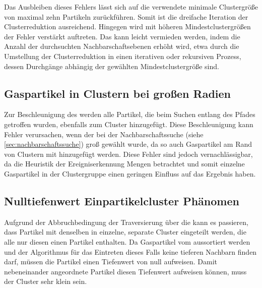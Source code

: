 Das Ausbleiben dieses Fehlers lässt sich auf die verwendete minimale Clustergröße von maximal zehn Partikeln zurückführen. Somit ist die dreifache Iteration der Clusterreduktion ausreichend. Hingegen wird mit höheren Mindestclustergrößen der Fehler verstärkt auftreten. Das kann leicht vermieden werden, indem die Anzahl der durchsuchten Nachbarschaftsebenen erhöht wird, etwa durch die Umstellung der Clusterreduktion in einen iterativen oder rekursiven Prozess, dessen Durchgänge abhängig der gewählten Mindestclustergröße sind.

\subsection*{Gaspartikel in Clustern bei großen Radien}

Zur Beschleunigung des \CFD werden alle Partikel, die beim Suchen entlang des Pfades getroffen wurden, ebenfalls zum Cluster hinzugefügt. Diese Beschleunigung kann Fehler verursachen, wenn der  bei der Nachbarschaftssuche (siehe \autoref{sec:nachbarschaftssuche}) groß gewählt wurde, da so auch Gaspartikel am Rand von Clustern mit hinzugefügt werden. Diese Fehler sind jedoch vernachlässigbar, da die Heuristik der Ereigniserkennung Mengen betrachtet und somit einzelne Gaspartikel in der Clustergruppe einen geringen Einfluss auf das Ergebnis haben.

\subsection*{Nulltiefenwert Einpartikelcluster Phänomen}\label{sec:nulltiefenwert-einpartikel-cluster} %

Aufgrund der Abbruchbedingung der Traversierung über die  kann es passieren, dass Partikel mit denselben  in einzelne, separate Cluster eingeteilt werden, die alle nur diesen einen Partikel enthalten. Da Gaspartikel vom \CFD aussortiert werden und der Algorithmus für das Eintreten dieses Falls keine tieferen Nachbarn finden darf, müssen die Partikel einen Tiefenwert von null aufweisen. Damit nebeneinander angeordnete Partikel diesen Tiefenwert aufweisen können, muss der Cluster sehr klein sein.

